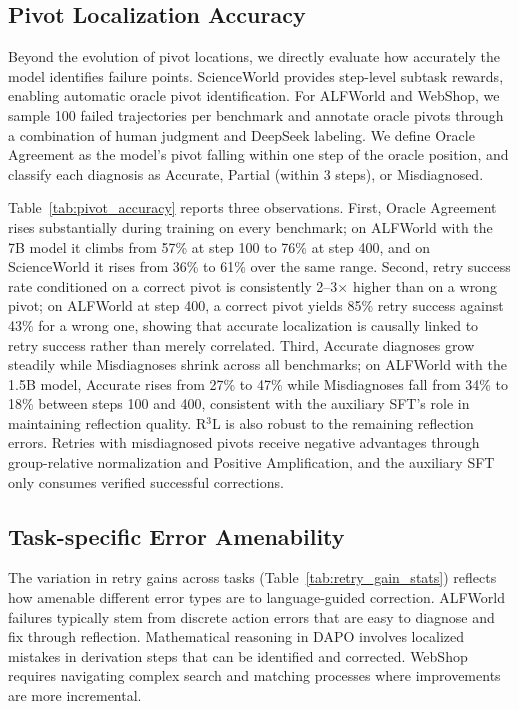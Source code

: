 \documentclass[11pt]{article}
\theoremstyle{definition}
\theoremstyle{remark}
\begin{document}
\subsection{Pivot Localization Accuracy}
\label{sec:pivot_accuracy}

Beyond the evolution of pivot locations, we directly evaluate how accurately the model identifies failure points. ScienceWorld provides step-level subtask rewards, enabling automatic oracle pivot identification. For ALFWorld and WebShop, we sample 100 failed trajectories per benchmark and annotate oracle pivots through a combination of human judgment and DeepSeek labeling. We define Oracle Agreement as the model's pivot falling within one step of the oracle position, and classify each diagnosis as Accurate, Partial (within 3 steps), or Misdiagnosed.



Table~\ref{tab:pivot_accuracy} reports three observations. First, Oracle Agreement rises substantially during training on every benchmark; on ALFWorld with the 7B model it climbs from 57\% at step 100 to 76\% at step 400, and on ScienceWorld it rises from 36\% to 61\% over the same range. Second, retry success rate conditioned on a correct pivot is consistently 2--3$\times$ higher than on a wrong pivot; on ALFWorld at step 400, a correct pivot yields 85\% retry success against 43\% for a wrong one, showing that accurate localization is causally linked to retry success rather than merely correlated. Third, Accurate diagnoses grow steadily while Misdiagnoses shrink across all benchmarks; on ALFWorld with the 1.5B model, Accurate rises from 27\% to 47\% while Misdiagnoses fall from 34\% to 18\% between steps 100 and 400, consistent with the auxiliary SFT's role in maintaining reflection quality. R$^3$L is also robust to the remaining reflection errors. Retries with misdiagnosed pivots receive negative advantages through group-relative normalization and Positive Amplification, and the auxiliary SFT only consumes verified successful corrections.

\subsection{Task-specific Error Amenability}
\label{sec:error_amenability}

The variation in retry gains across tasks (Table~\ref{tab:retry_gain_stats}) reflects how amenable different error types are to language-guided correction. ALFWorld failures typically stem from discrete action errors that are easy to diagnose and fix through reflection. Mathematical reasoning in DAPO involves localized mistakes in derivation steps that can be identified and corrected. WebShop requires navigating complex search and matching processes where improvements are more incremental.
\end{document}
